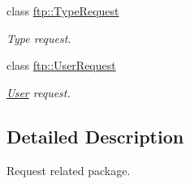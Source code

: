 \begin{DoxyCompactItemize}
class \hyperlink{classftp_1_1_type_request}{ftp\-::\-Type\-Request}
\begin{DoxyCompactList}\small\item\em Type request. \end{DoxyCompactList}\item 
class \hyperlink{classftp_1_1_user_request}{ftp\-::\-User\-Request}
\begin{DoxyCompactList}\small\item\em \hyperlink{structftp_1_1_user}{User} request. \end{DoxyCompactList}\end{DoxyCompactItemize}


\subsection{Detailed Description}
Request related package. 